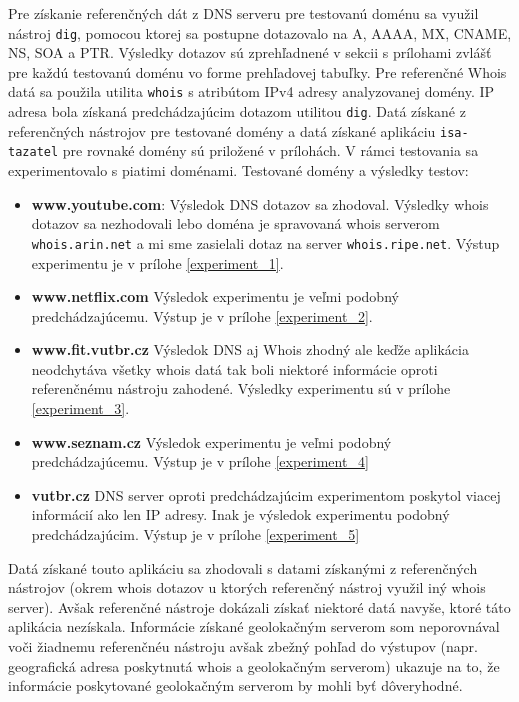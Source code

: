 \documentclass[a4paper, 11pt]{article}
\begin{document}
Pre získanie referenčných dát z DNS serveru pre testovanú doménu sa využil nástroj \texttt{dig}, pomocou ktorej sa postupne dotazovalo na A, AAAA, MX, CNAME, NS, SOA a PTR. Výsledky dotazov sú zprehľadnené v sekcii s prílohami zvlášť pre každú testovanú doménu vo forme prehľadovej tabuľky. Pre referenčné Whois datá sa použila utilita \texttt{whois} s atribútom IPv4 adresy analyzovanej domény. IP adresa bola získaná predchádzajúcim dotazom utilitou \texttt{dig}. Datá získané z referenčných nástrojov pre testované domény a datá získané  aplikáciu \texttt{isa-tazatel} pre rovnaké domény sú priložené v prílohách. V rámci testovania sa experimentovalo s piatimi doménami. Testované domény a výsledky testov:
\begin{itemize}
	\item \textbf{www.youtube.com}: Výsledok DNS dotazov sa zhodoval. Výsledky whois dotazov sa nezhodovali lebo doména je spravovaná whois serverom \texttt{whois.arin.net} a mi sme zasielali dotaz na server \texttt{whois.ripe.net}. Výstup experimentu je v prílohe \ref{experiment_1}.
	\item \textbf{www.netflix.com} Výsledok experimentu je veľmi podobný predchádzajúcemu. Výstup je v prílohe \ref{experiment_2}.
	\item \textbf{www.fit.vutbr.cz} Výsledok DNS aj Whois zhodný ale keďže aplikácia neodchytáva všetky whois datá tak boli niektoré informácie oproti referenčnému nástroju zahodené. Výsledky experimentu sú v prílohe \ref{experiment_3}.
	\item \textbf{www.seznam.cz} Výsledok experimentu je veľmi podobný predchádzajúcemu. Výstup je v prílohe  \ref{experiment_4}
	\item \textbf{vutbr.cz} DNS server oproti predchádzajúcim experimentom poskytol viacej informácií ako len IP adresy. Inak je výsledok experimentu podobný predchádzajúcim. Výstup je v prílohe \ref{experiment_5}
\end{itemize}
Datá získané touto aplikáciu sa zhodovali s datami získanými z referenčných nástrojov (okrem whois dotazov u ktorých referenčný nástroj využil iný whois server). Avšak referenčné nástroje dokázali získať niektoré datá navyše, ktoré táto aplikácia nezískala. Informácie získané geolokačným serverom som neporovnával voči žiadnemu referenčnéu nástroju avšak zbežný pohľad do výstupov (napr. geografická adresa poskytnutá whois a geolokačným serverom) ukazuje na to, že informácie poskytované geolokačným serverom by mohli byť dôveryhodné.
\end{document}
